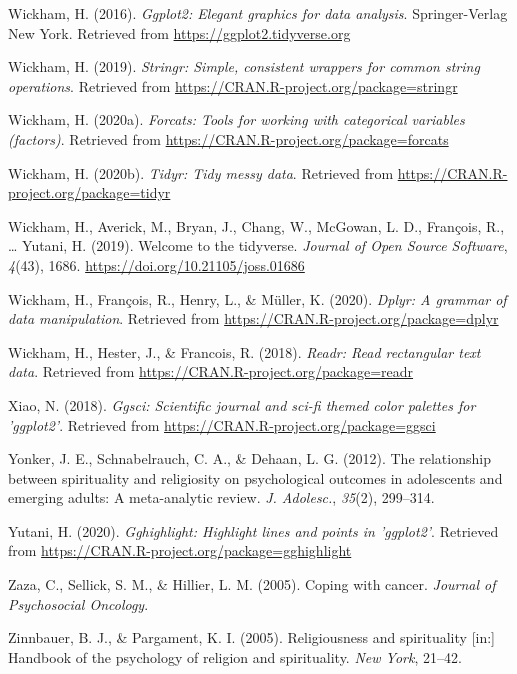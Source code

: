 \documentclass[
  english,
  man,floatsintext]{apa6}
\begin{document}
\leavevmode\hypertarget{ref-R-ggplot2}{}%
Wickham, H. (2016). \emph{Ggplot2: Elegant graphics for data analysis}. Springer-Verlag New York. Retrieved from \url{https://ggplot2.tidyverse.org}

\leavevmode\hypertarget{ref-R-stringr}{}%
Wickham, H. (2019). \emph{Stringr: Simple, consistent wrappers for common string operations}. Retrieved from \url{https://CRAN.R-project.org/package=stringr}

\leavevmode\hypertarget{ref-R-forcats}{}%
Wickham, H. (2020a). \emph{Forcats: Tools for working with categorical variables (factors)}. Retrieved from \url{https://CRAN.R-project.org/package=forcats}

\leavevmode\hypertarget{ref-R-tidyr}{}%
Wickham, H. (2020b). \emph{Tidyr: Tidy messy data}. Retrieved from \url{https://CRAN.R-project.org/package=tidyr}

\leavevmode\hypertarget{ref-R-tidyverse}{}%
Wickham, H., Averick, M., Bryan, J., Chang, W., McGowan, L. D., François, R., \ldots{} Yutani, H. (2019). Welcome to the tidyverse. \emph{Journal of Open Source Software}, \emph{4}(43), 1686. \url{https://doi.org/10.21105/joss.01686}

\leavevmode\hypertarget{ref-R-dplyr}{}%
Wickham, H., François, R., Henry, L., \& Müller, K. (2020). \emph{Dplyr: A grammar of data manipulation}. Retrieved from \url{https://CRAN.R-project.org/package=dplyr}

\leavevmode\hypertarget{ref-R-readr}{}%
Wickham, H., Hester, J., \& Francois, R. (2018). \emph{Readr: Read rectangular text data}. Retrieved from \url{https://CRAN.R-project.org/package=readr}

\leavevmode\hypertarget{ref-R-ggsci}{}%
Xiao, N. (2018). \emph{Ggsci: Scientific journal and sci-fi themed color palettes for 'ggplot2'}. Retrieved from \url{https://CRAN.R-project.org/package=ggsci}

\leavevmode\hypertarget{ref-Yonker2012-zg}{}%
Yonker, J. E., Schnabelrauch, C. A., \& Dehaan, L. G. (2012). The relationship between spirituality and religiosity on psychological outcomes in adolescents and emerging adults: A meta-analytic review. \emph{J. Adolesc.}, \emph{35}(2), 299--314.

\leavevmode\hypertarget{ref-R-gghighlight}{}%
Yutani, H. (2020). \emph{Gghighlight: Highlight lines and points in 'ggplot2'}. Retrieved from \url{https://CRAN.R-project.org/package=gghighlight}

\leavevmode\hypertarget{ref-Zaza2005-ac}{}%
Zaza, C., Sellick, S. M., \& Hillier, L. M. (2005). Coping with cancer. \emph{Journal of Psychosocial Oncology}.

\leavevmode\hypertarget{ref-Zinnbauer2005-vz}{}%
Zinnbauer, B. J., \& Pargament, K. I. (2005). Religiousness and spirituality {[}in:{]} Handbook of the psychology of religion and spirituality. \emph{New York}, 21--42.

\endgroup
\end{document}

